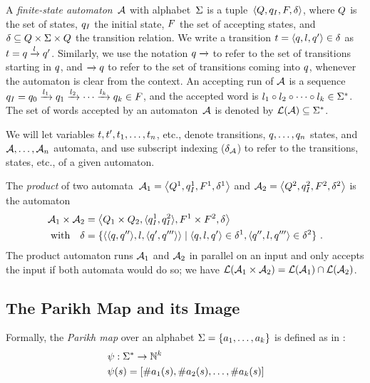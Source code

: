 A \emph{finite-state automaton}~$\mathcal{A}$ with alphabet~$\Sigma$ is a
tuple~$\left\langle Q, q_I, F, \delta\right\rangle$, where $Q$ is the set of states,
$q_I$ the initial state, $F$ the set of
accepting states, and
$\delta \subseteq Q \times \Sigma \times Q$ the
transition relation.  We write a transition
$t = \left\langle q, l, q'\right\rangle \in \delta$ as
$t = q \xrightarrow{l} q'$.  Similarly, we
use the notation $q \xrightarrow{}$ to refer to the set of
transitions starting in $q$, and $\xrightarrow{} q$ to
refer to the set of transitions coming into $q$, whenever the
automaton is clear from the context. An accepting run of $\mathcal{A}$
is a sequence
$q_I = q_0 \xrightarrow{l_1} q_1 \xrightarrow{l_2} \cdots
\xrightarrow{l_k} q_k \in F$, and the accepted word is
$l_1 \circ l_2 \circ \cdots \circ l_k \in \Sigma^*$. The set of words accepted by an
automaton~$\mathcal{A}$ is denoted by
$\operatorname{\mathcal{L}}(\mathcal{A}) \subseteq \Sigma^*$.

We will let variables $t, t', t_1, \ldots,
t_n$, etc., denote transitions, $q, \ldots, q_n$ states, and
$\mathcal{A}, \ldots, \mathcal{A}_n$ automata, and use subscript indexing
($\delta_{\mathcal{A}}$) to refer to the transitions, states, etc., of a given
automaton.

The \emph{product} of two
automata~$\mathcal{A}_1 = \left\langle Q^1, q_I^1,
  F^1, \delta^1\right\rangle$ and
$\mathcal{A}_2 = \left\langle Q^2, q_I^2,
  F^2, \delta^2\right\rangle$ is the automaton
\begin{align*}
\mathcal{A}_1 \times \mathcal{A}_2 &=
\left\langle Q_1 \times Q_2, \langle q_I^1, q_I^2\rangle,
F^1 \times F^2,
  \delta\right\rangle\\
  \text{with}\quad \delta &= \{\langle\langle q,q''\rangle, l, \langle q',q'''\rangle\rangle \mid \langle q, l, q'\rangle \in \delta^1, \langle q'', l, q'''\rangle \in \delta^2\}~.
\end{align*}
The product automaton runs $\mathcal{A}_1$ and $\mathcal{A}_2$ in
parallel on an input and only accepts the input if both automata would
do so; we have $\operatorname{\mathcal{L}}(\mathcal{A}_1 \times \mathcal{A}_2) =
\operatorname{\mathcal{L}}(\mathcal{A}_1) \cap \operatorname{\mathcal{L}}(\mathcal{A}_2)$.

\subsection{The Parikh Map and its Image}
Formally, the \textit{Parikh map} over an alphabet $\Sigma=
\left\{a_1, \ldots, a_k \right\}$ is defined as in \cite{kozen}:
$$
\begin{aligned}
& \operatorname{\psi}: \Sigma^* \rightarrow \mathbb{N}^k \\
& \operatorname{\psi}(s) = \left[{\#a_1(s), \#a_2(s), \ldots, \#a_k(s)}\right]
\end{aligned}
$$

